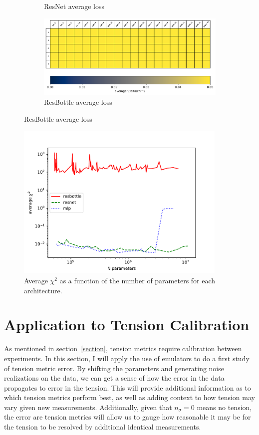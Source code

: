 \begin{figure}[tb]
\begin{subfigure}[b]{0.49\textwidth}
		\caption{ResNet average loss}
		\label{fig:resnet_table}
	\end{subfigure}
	\begin{subfigure}[b]{0.9\textwidth}
		\includegraphics[width=\textwidth]{plots/model_table_resbottle.pdf}
		\caption{ResBottle average loss}
		\label{fig:resbottle_table}
	\end{subfigure}
	\label{fig:model_tables}
\end{figure}

\begin{figure}[tb]
	\centering
	\includegraphics[width=0.9\textwidth]{plots/avg_chi2_v_n_params_new.pdf}
	\caption{Average $\chi^2$ as a function of the number of parameters for each architecture.}
	\label{fig:avg_chi2_nparams}
\end{figure}
\section{Application to Tension Calibration}
As mentioned in section~\ref{section}, tension metrics require calibration between experiments. In this section, I will apply the use of emulators to do a first study of tension metric error. By shifting the parameters and generating noise realizations on the data, we can get a sense of how the error in the data propagates to error in the tension. This will provide additional information as to which tension metrics perform best, as well as adding context to how tension may vary given new measurements. Additionally, given that $n_\sigma=0$ means no tension, the error are tension metrics will allow us to gauge how reasonable it may be for the tension to be resolved by additional identical measurements.

